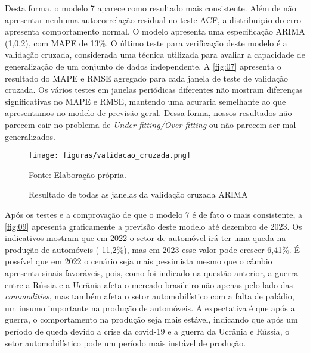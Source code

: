 \documentclass[
article, %
12pt, %
oneside, %
a4paper, %
portuguese, %
portuguese %
]{abntex2}
\begin{document}
Desta forma, o modelo 7 aparece como resultado mais consistente. Além de não apresentar nenhuma autocorrelação residual no teste ACF, a distribuição do erro apresenta comportamento normal. O modelo apresenta uma especificação ARIMA (1,0,2), com MAPE de 13\%. O último teste para verificação deste modelo é a validação cruzada, considerada uma técnica utilizada para avaliar a capacidade de generalização de um conjunto de dados independente. A \autoref{fig:07} apresenta o resultado do MAPE e RMSE agregado para cada janela de teste de validação cruzada. Os vários testes em janelas periódicas diferentes não mostram diferenças significativas no MAPE e RMSE, mantendo uma acuraria semelhante ao que apresentamos no modelo de previsão geral. Dessa forma, nossos resultados não parecem cair no problema de \textit{Under-fitting/Over-fitting} ou não parecem ser mal generalizados.

\begin{figure}[H]
         \centering
        \caption{Resultado de todas as janelas da validação cruzada ARIMA}
         \texttt{[image: figuras/validacao\_cruzada.png]}
    \begin{flushleft}
    Fonte: Elaboração própria.
    \end{flushleft}

        \label{fig:07}
\end{figure}

Após os testes e a comprovação de que o modelo 7 é de fato o mais consistente, a \autoref{fig:09} apresenta graficamente a previsão deste modelo até dezembro de 2023. Os indicativos mostram que em 2022 o setor de automóvel irá ter uma queda na produção de automóveis (-11,2\%), mas em 2023 esse valor pode crescer 6,41\%. É possível que em 2022 o cenário seja mais pessimista mesmo que o câmbio apresenta sinais favoráveis, pois, como foi indicado na questão anterior, a guerra entre a Rússia e a Ucrânia afeta o mercado brasileiro não apenas pelo lado das \textit{commodities}, mas também afeta o setor automobilístico com a falta de paládio, um insumo importante na produção de automóveis. A expectativa é que após a guerra, o comportamento na produção seja mais estável, indicando que após um período de queda devido a crise da covid-19 e a guerra da Ucrânia e Rússia, o setor automobilístico pode um período mais instável de produção.

\end{document}
